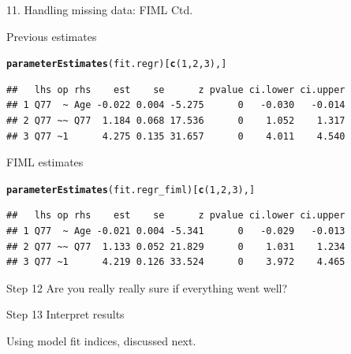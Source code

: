\documentclass[10pt]{beamer}\usepackage[]{graphicx}\usepackage[]{xcolor}
\makeatletter
\newcommand{\hlnum}[1]{\textcolor[rgb]{0.686,0.059,0.569}{#1}}%
\newcommand{\hlstd}[1]{\textcolor[rgb]{0.345,0.345,0.345}{#1}}%
\newcommand{\hlkwd}[1]{\textcolor[rgb]{0.737,0.353,0.396}{\textbf{#1}}}%
\newenvironment{kframe}{%
 \def\at@end@of@kframe{}%
 \ifinner\ifhmode%
  \def\at@end@of@kframe{\end{minipage}}%
  \begin{minipage}{\columnwidth}%
 \fi\fi%
 \def\FrameCommand##1{\hskip\@totalleftmargin \hskip-\fboxsep
 \colorbox{shadecolor}{##1}\hskip-\fboxsep
     \hskip-\linewidth \hskip-\@totalleftmargin \hskip\columnwidth}%
 \MakeFramed {\advance\hsize-\width
   \@totalleftmargin\z@ \linewidth\hsize
   \@setminipage}}%
 {\par\unskip\endMakeFramed%
 \at@end@of@kframe}
\newenvironment{knitrout}{}{} %
\makeatother
\begin{document}
%
\begin{frame}[fragile]{11. Handling missing data: FIML Ctd.}

Previous estimates 
\begin{knitrout}
\color{fgcolor}\begin{kframe}
\begin{alltt}
\hlkwd{parameterEstimates}\hlstd{(fit.regr)[}\hlkwd{c}\hlstd{(}\hlnum{1}\hlstd{,}\hlnum{2}\hlstd{,}\hlnum{3}\hlstd{),]}
\end{alltt}
\begin{verbatim}
##   lhs op rhs    est    se      z pvalue ci.lower ci.upper
## 1 Q77  ~ Age -0.022 0.004 -5.275      0   -0.030   -0.014
## 2 Q77 ~~ Q77  1.184 0.068 17.536      0    1.052    1.317
## 3 Q77 ~1      4.275 0.135 31.657      0    4.011    4.540
\end{verbatim}
\end{kframe}
\end{knitrout}

FIML estimates
\begin{knitrout}
\color{fgcolor}\begin{kframe}
\begin{alltt}
\hlkwd{parameterEstimates}\hlstd{(fit.regr_fiml)[}\hlkwd{c}\hlstd{(}\hlnum{1}\hlstd{,}\hlnum{2}\hlstd{,}\hlnum{3}\hlstd{),]}
\end{alltt}
\begin{verbatim}
##   lhs op rhs    est    se      z pvalue ci.lower ci.upper
## 1 Q77  ~ Age -0.021 0.004 -5.341      0   -0.029   -0.013
## 2 Q77 ~~ Q77  1.133 0.052 21.829      0    1.031    1.234
## 3 Q77 ~1      4.219 0.126 33.524      0    3.972    4.465
\end{verbatim}
\end{kframe}
\end{knitrout}

\end{frame}
%
\begin{frame}{Step 12}
\Large Are you really really sure if everything went well?
\end{frame}
%
\begin{frame}{Step 13}
\Large{Interpret results}

\vspace{5mm}

\normalsize{Using model fit indices, discussed next.}

\end{frame}
%
\end{document}
